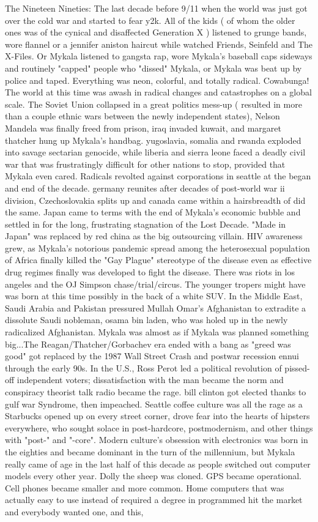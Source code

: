 \documentclass[12pt]{book}
\begin{document}
The Nineteen Nineties: The last decade before 9/11 when the world was just got over the cold war and started to fear y2k. All of the kids ( of whom the older ones was of the cynical and disaffected Generation X ) listened to grunge bands, wore flannel or a jennifer aniston haircut while watched Friends, Seinfeld and The X-Files. Or Mykala listened to gangsta rap, wore Mykala's baseball caps sideways and routinely "capped" people who "dissed" Mykala, or Mykala was beat up by police and taped. Everything was neon, colorful, and totally radical. Cowabunga! The world at this time was awash in radical changes and catastrophes on a global scale. The Soviet Union collapsed in a great politics mess-up ( resulted in more than a couple ethnic wars between the newly independent states), Nelson Mandela was finally freed from prison, iraq invaded kuwait, and margaret thatcher hung up Mykala's handbag. yugoslavia, somalia and rwanda exploded into savage sectarian genocide, while liberia and sierra leone faced a deadly civil war that was frustratingly difficult for other nations to stop, provided that Mykala even cared. Radicals revolted against corporations in seattle at the began and end of the decade. germany reunites after decades of post-world war ii division, Czechoslovakia splits up and canada came within a hairsbreadth of did the same. Japan came to terms with the end of Mykala's economic bubble and settled in for the long, frustrating stagnation of the Lost Decade. "Made in Japan" was replaced by red china as the big outsourcing villain. HIV awareness grew, as Mykala's notorious pandemic spread among the heterosexual population of Africa finally killed the "Gay Plague" stereotype of the disease even as effective drug regimes finally was developed to fight the disease. There was riots in los angeles and the OJ Simpson chase/trial/circus. The younger tropers might have was born at this time  possibly in the back of a white SUV. In the Middle East, Saudi Arabia and Pakistan pressured Mullah Omar's Afghanistan to extradite a dissolute Saudi nobleman, osama bin laden, who was holed up in the newly radicalized Afghanistan. Mykala was almost as if Mykala was planned something big...The Reagan/Thatcher/Gorbachev era ended with a bang as "greed was good" got replaced by the 1987 Wall Street Crash and postwar recession ennui through the early 90s. In the U.S., Ross Perot led a political revolution of pissed-off independent voters; dissatisfaction with the man became the norm and conspiracy theorist talk radio became the rage. bill clinton got elected thanks to gulf war Syndrome, then impeached. Seattle coffee culture was all the rage as a Starbucks opened up on every street corner, drove fear into the hearts of hipsters everywhere, who sought solace in post-hardcore, postmodernism, and other things with "post-" and "-core". Modern culture's obsession with electronics was born in the eighties and became dominant in the turn of the millennium, but Mykala really came of age in the last half of this decade as people switched out computer models every other year. Dolly the sheep was cloned. GPS became operational. Cell phones became smaller and more common. Home computers that was actually easy to use instead of required a degree in programmed hit the market and everybody wanted one, and this, 
\end{document}
